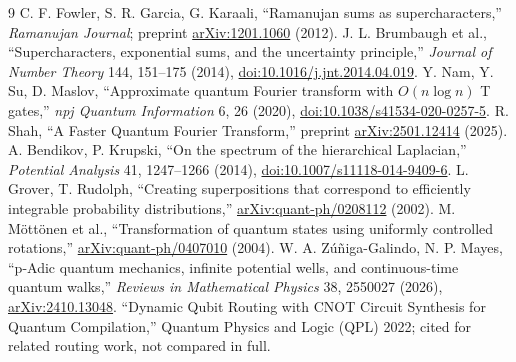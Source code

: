 \documentclass[11pt]{article}
\begin{document}
\begin{thebibliography}{9}\small
{} C. F. Fowler, S. R. Garcia, G. Karaali, ``Ramanujan sums as supercharacters,'' \emph{Ramanujan Journal}; preprint \href{https://arxiv.org/abs/1201.1060}{arXiv:1201.1060} (2012).
 J. L. Brumbaugh et al., ``Supercharacters, exponential sums, and the uncertainty principle,'' \emph{Journal of Number Theory} 144, 151--175 (2014), \href{https://doi.org/10.1016/j.jnt.2014.04.019}{doi:10.1016/j.jnt.2014.04.019}.
 Y. Nam, Y. Su, D. Maslov, ``Approximate quantum Fourier transform with $O(n\log n)$ T gates,'' \emph{npj Quantum Information} 6, 26 (2020), \href{https://doi.org/10.1038/s41534-020-0257-5}{doi:10.1038/s41534-020-0257-5}.
 R. Shah, ``A Faster Quantum Fourier Transform,'' preprint \href{https://arxiv.org/abs/2501.12414}{arXiv:2501.12414} (2025).
 A. Bendikov, P. Krupski, ``On the spectrum of the hierarchical Laplacian,'' \emph{Potential Analysis} 41, 1247--1266 (2014), \href{https://doi.org/10.1007/s11118-014-9409-6}{doi:10.1007/s11118-014-9409-6}.
 L. Grover, T. Rudolph, ``Creating superpositions that correspond to efficiently integrable probability distributions,'' \href{https://arxiv.org/abs/quant-ph/0208112}{arXiv:quant-ph/0208112} (2002).
 M. M\"ott\"onen et al., ``Transformation of quantum states using uniformly controlled rotations,'' \href{https://arxiv.org/abs/quant-ph/0407010}{arXiv:quant-ph/0407010} (2004).
 W. A. Z\'u\~niga-Galindo, N. P. Mayes, ``p-Adic quantum mechanics, infinite potential wells, and continuous-time quantum walks,'' \emph{Reviews in Mathematical Physics} 38, 2550027 (2026), \href{https://arxiv.org/abs/2410.13048}{arXiv:2410.13048}.
 ``Dynamic Qubit Routing with CNOT Circuit Synthesis for Quantum Compilation,'' Quantum Physics and Logic (QPL) 2022; cited for related routing work, not compared in full.
\end{thebibliography}
\end{document}
